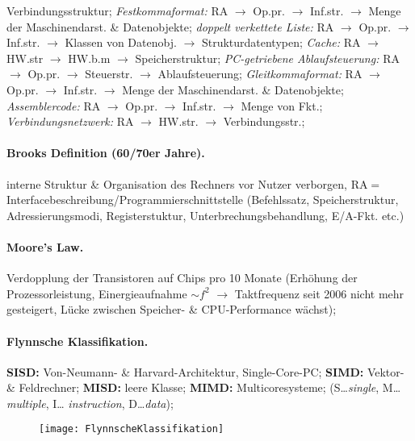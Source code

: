 \documentclass[8pt,a4paper]{article}
\begin{document}
\begin{multicols}{2}
Verbindungsstruktur;
\emph{Festkommaformat:} RA $\rightarrow$ Op.pr. $\rightarrow$
Inf.str. $\rightarrow$ Menge der Maschinendarst. \& Datenobjekte;
\emph{doppelt verkettete Liste:} RA $\rightarrow$ Op.pr. $\rightarrow$
Inf.str. $\rightarrow$ Klassen von Datenobj. $\rightarrow$
Strukturdatentypen;
\emph{Cache:} RA $\rightarrow$ HW.str $\rightarrow$ HW.b.m
$\rightarrow$ Speicherstruktur;
\emph{PC-getriebene Ablaufsteuerung:} RA $\rightarrow$ Op.pr. $\rightarrow$
Steuerstr. $\rightarrow$ Ablaufsteuerung;
\emph{Gleitkommaformat:} RA $\rightarrow$ Op.pr. $\rightarrow$
Inf.str. $\rightarrow$ Menge der Maschinendarst. \& Datenobjekte;
\emph{Assemblercode:} RA $\rightarrow$ Op.pr. $\rightarrow$
Inf.str. $\rightarrow$ Menge von Fkt.;
\emph{Verbindungsnetzwerk:} RA $\rightarrow$ HW.str. $\rightarrow$
Verbindungsstr.;

\paragraph{Brooks Definition (60/70er Jahre).} interne Struktur \&
Organisation des Rechners vor Nutzer verborgen, RA$=$
Interfacebeschreibung/Programmierschnittstelle (Befehlssatz, Speicherstruktur,
Adressierungsmodi, Registerstuktur, Unterbrechungsbehandlung,
E/A-Fkt. etc.) 

\paragraph{Moore's Law.} Verdopplung der Transistoren auf Chips pro 10
Monate (Erhöhung der Prozessorleistung, Einergieaufnahme $\sim f^2$
$\rightarrow$ Taktfrequenz seit 2006 nicht mehr gesteigert, Lücke
zwischen Speicher- \& CPU-Performance wächst);

\paragraph{Flynnsche Klassifikation.} \textbf{SISD:}
Von-Neumann- \& Harvard-Architektur, Single-Core-PC; \textbf{SIMD:}
Vektor- \& Feldrechner; \textbf{MISD:} leere Klasse; \textbf{MIMD:}
Multicoresysteme;
(S\ldots \emph{single}, M\ldots \emph{multiple}, I\ldots
\emph{instruction}, D\ldots \emph{data});
\begin{figure}[H]
  \centering
  \texttt{[image: FlynnscheKlassifikation]}
\end{figure}


\end{multicols}
\end{document}

